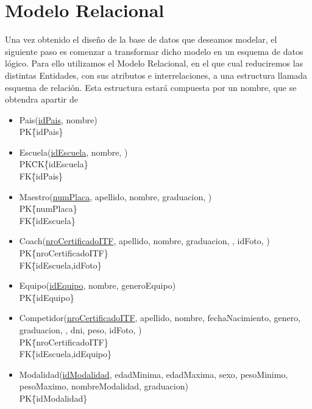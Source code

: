 \section{Modelo Relacional}

Una vez obtenido el diseño de la base de datos que deseamos modelar, el siguiente paso es comenzar a transformar dicho modelo en un esquema de datos lógico. Para ello utilizamos el Modelo Relacional, en el que cual reduciremos las distintas Entidades, con sus atributos e interrelaciones, a una estructura llamada esquema de relación. Esta estructura estará compuesta por un nombre, que se obtendra apartir de 

\begin{itemize}

\item{Pais(\underline{idPais}, nombre)\\
PK\=\{idPais\}}

\item{Escuela(\underline{idEscuela}, nombre, )\\
PK\=CK\=\{idEscuela\}\\
FK\=\{idPais\}
}

\item{Maestro(\underline{numPlaca}, apellido, nombre, graduacion, )\\
PK\=\{numPlaca\} \\
FK\=\{idEscuela\} \\
}

\item{Coach(\underline{nroCertificadoITF}, apellido, nombre, graduacion, , idFoto, )\\
PK\=\{nroCertificadoITF\} \\
FK\=\{idEscuela,idFoto\} \\
}

\item{Equipo(\underline{idEquipo}, nombre, generoEquipo)\\
PK\=\{idEquipo\} \\
}

\item{Competidor(\underline{nroCertificadoITF}, apellido, nombre, fechaNacimiento, genero, graduacion, , dni, peso, idFoto,  ) \\
PK\=\{nroCertificadoITF\} \\
FK\=\{idEscuela,idEquipo\}
}

\item{Modalidad(\underline{idModalidad}, edadMinima, edadMaxima, sexo, pesoMinimo, pesoMaximo, nombreModalidad, graduacion) \\
PK\=\{idModalidad\}
}


\end{itemize}
